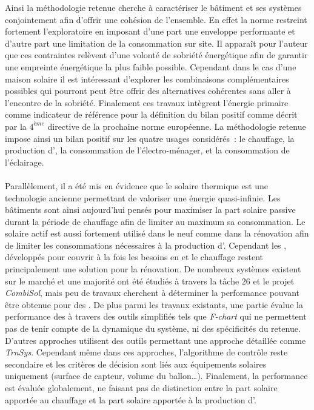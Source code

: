 Ainsi la méthodologie retenue cherche à caractériser le bâtiment et ses systèmes conjointement
afin d’offrir une cohésion de l’ensemble. En effet la norme restreint fortement l’exploratoire
en imposant d’une part une enveloppe performante et d’autre part une limitation de la
consommation sur site. Il apparaît pour l’auteur que ces contraintes relèvent
d’une volonté de sobriété énergétique afin de garantir une empreinte énergétique
la plus faible possible. Cependant dans le cas d’une maison solaire il est intéressant
d’explorer les combinaisons complémentaires possibles qui pourront peut être offrir des alternatives
cohérentes sans aller à l’encontre de la sobriété.
Finalement ces travaux intègrent l’énergie primaire comme indicateur de référence
pour la définition du bilan positif comme décrit par la $4^{ème}$ directive de la
prochaine norme européenne. La méthodologie retenue impose ainsi un bilan positif
sur les quatre usages considérés~: le chauffage, la production d’, la
consommation de l’électro-ménager, et la consommation de l’éclairage.

\paragraph{} %
Parallèlement, il a été mis en évidence que le solaire thermique est une technologie ancienne
permettant de valoriser une énergie quasi-infinie. Les bâtiments sont ainsi aujourd’hui
pensés pour maximiser la part solaire passive durant la période de chauffage afin de
limiter au maximum sa consommation. Le solaire actif est aussi fortement utilisé dans le
neuf comme dans la rénovation afin de limiter les consommations nécessaires à la
production d’. Cependant les , développés pour couvrir à la fois les
besoins en  et le chauffage restent principalement une solution pour la
rénovation. De nombreux systèmes existent sur le marché et une majorité ont été étudiés à
travers la tâche $26$ et le projet \textit{CombiSol}, mais peu de travaux cherchent à
déterminer la performance pouvant être obtenue pour des . De plus parmi les
travaux existants, une partie évalue la performance des  à travers des outils
simplifiés tels que \textit{F-chart} qui ne permettent pas de tenir compte de la dynamique
du système, ni des spécificités du  retenue. D’autres approches utilisent des
outils permettant une approche détaillée comme \textit{TrnSys}. Cependant
même dans ces approches, l’algorithme de contrôle reste secondaire et les critères de
décision sont liés aux équipements solaires uniquement (surface de capteur, volume du
ballon\dots). Finalement, la performance est évaluée globalement, ne faisant pas de
distinction entre la part solaire apportée au chauffage et la part solaire apportée à la
production d’.

